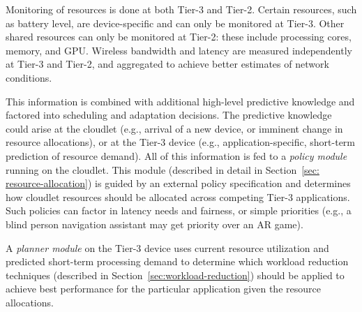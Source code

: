 Monitoring of resources is done at both Tier-3 and Tier-2.  Certain
resources, such as battery level, are device-specific and can only be
monitored at Tier-3.  Other shared resources can only be monitored at
Tier-2: these include processing cores, memory, and GPU.  Wireless
bandwidth and latency are measured independently at Tier-3 and Tier-2,
and aggregated to achieve better estimates of network conditions.

This information is combined with additional high-level predictive
knowledge and factored into scheduling and adaptation decisions.  The
predictive knowledge could arise at the cloudlet (e.g., arrival of a
new device, or imminent change in resource allocations), or at the
Tier-3 device (e.g., application-specific, short-term prediction of
resource demand).  All of this information is fed to a {\em policy
  module} running on the cloudlet.  This module (described in detail
in Section~\ref{sec: resource-allocation}) is guided by an external
policy specification and determines how cloudlet resources should be
allocated across competing Tier-3 applications.  Such policies can
factor in latency needs and fairness, or simple priorities (e.g., a
blind person navigation assistant may get priority over an AR game).

A {\em planner module} on the Tier-3 device uses current resource
utilization and predicted short-term processing demand to determine
which workload reduction techniques (described in
Section~\ref{sec:workload-reduction}) should be applied to achieve
best performance for the particular application given the resource
allocations.

